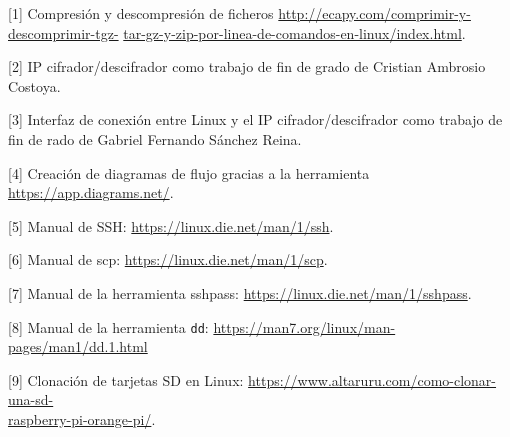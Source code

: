 \hspace{0.5cm}	[\hypertarget{1}{1}] Compresión y descompresión de ficheros \url{http://ecapy.com/comprimir-y-descomprimir-tgz-} \url{tar-gz-y-zip-por-linea-de-comandos-en-linux/index.html}.
	
\hspace{0.5cm}	[\hypertarget{2}{2}] IP cifrador/descifrador como trabajo de fin de grado de Cristian Ambrosio Costoya.
	
\hspace{0.5cm}	[\hypertarget{3}{3}] Interfaz de conexión entre Linux y el IP cifrador/descifrador como trabajo de fin de rado de Gabriel Fernando Sánchez Reina.
	
\hspace{0.5cm}	[\hypertarget{4}{4}] Creación de diagramas de flujo gracias a la herramienta \url{https://app.diagrams.net/}.
	
\hspace{0.5cm}	[\hypertarget{5}{5}] Manual de SSH: \url{https://linux.die.net/man/1/ssh}.
	
\hspace{0.5cm}	[\hypertarget{6}{6}] Manual de scp: \url{https://linux.die.net/man/1/scp}.
	
\hspace{0.5cm}	[\hypertarget{7}{7}] Manual de la herramienta sshpass: \url{https://linux.die.net/man/1/sshpass}.
	
\hspace{0.5cm}	[\hypertarget{8}{8}] Manual de la herramienta \texttt{dd}: \url{https://man7.org/linux/man-pages/man1/dd.1.html}
	
\hspace{0.5cm}	[\hypertarget{9}{9}] Clonación de tarjetas SD en Linux: \url{https://www.altaruru.com/como-clonar-una-sd-}\\
	\url{raspberry-pi-orange-pi/}.

